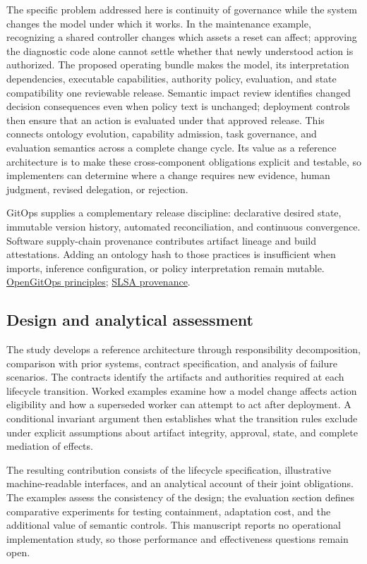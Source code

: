 \documentclass[preprint,12pt,authoryear]{elsarticle}
\begin{document}
The specific problem addressed here is continuity of governance while
the system changes the model under which it works. In the maintenance
example, recognizing a shared controller changes which assets a reset
can affect; approving the diagnostic code alone cannot settle whether
that newly understood action is authorized. The proposed operating
bundle makes the model, its interpretation dependencies, executable
capabilities, authority policy, evaluation, and state compatibility one
reviewable release. Semantic impact review identifies changed decision
consequences even when policy text is unchanged; deployment controls
then ensure that an action is evaluated under that approved release.
This connects ontology evolution, capability admission, task governance,
and evaluation semantics across a complete change cycle. Its value as a
reference architecture is to make these cross-component obligations
explicit and testable, so implementers can determine where a change
requires new evidence, human judgment, revised delegation, or rejection.

GitOps supplies a complementary release discipline: declarative desired
state, immutable version history, automated reconciliation, and
continuous convergence. Software supply-chain provenance contributes
artifact lineage and build attestations. Adding an ontology hash to
those practices is insufficient when imports, inference configuration,
or policy interpretation remain mutable.
\href{https://opengitops.dev/}{OpenGitOps principles};
\href{https://slsa.dev/spec/v1.0/provenance}{SLSA provenance}.

\subsection{Design and analytical
assessment}\label{design-and-analytical-assessment}

The study develops a reference architecture through responsibility
decomposition, comparison with prior systems, contract specification,
and analysis of failure scenarios. The contracts identify the artifacts
and authorities required at each lifecycle transition. Worked examples
examine how a model change affects action eligibility and how a
superseded worker can attempt to act after deployment. A conditional
invariant argument then establishes what the transition rules exclude
under explicit assumptions about artifact integrity, approval, state,
and complete mediation of effects.

The resulting contribution consists of the lifecycle specification,
illustrative machine-readable interfaces, and an analytical account of
their joint obligations. The examples assess the consistency of the
design; the evaluation section defines comparative experiments for
testing containment, adaptation cost, and the additional value of
semantic controls. This manuscript reports no operational implementation
study, so those performance and effectiveness questions remain open.
\end{document}
